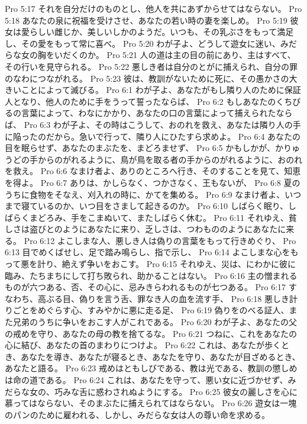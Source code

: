 Pro 5:17  それを自分だけのものとし、他人を共にあずからせてはならない。
Pro 5:18  あなたの泉に祝福を受けさせ、あなたの若い時の妻を楽しめ。
Pro 5:19  彼女は愛らしい雌じか、美しいしかのようだ。いつも、その乳ぶさをもって満足し、その愛をもって常に喜べ。
Pro 5:20  わが子よ、どうして遊女に迷い、みだらな女の胸をいだくのか。
Pro 5:21  人の道は主の目の前にあり、主はすべて、その行いを見守られる。
Pro 5:22  悪しき者は自分のとがに捕えられ、自分の罪のなわにつながれる。
Pro 5:23  彼は、教訓がないために死に、その愚かさの大きいことによって滅びる。
Pro 6:1  わが子よ、あなたがもし隣り人のために保証人となり、他人のために手をうって誓ったならば、
Pro 6:2  もしあなたのくちびるの言葉によって、わなにかかり、あなたの口の言葉によって捕えられたならば、
Pro 6:3  わが子よ、その時はこうして、おのれを救え、あなたは隣り人の手に陥ったのだから。急いで行って、隣り人にひたすら求めよ。
Pro 6:4  あなたの目を眠らせず、あなたのまぶたを、まどろませず、
Pro 6:5  かもしかが、かりゅうどの手からのがれるように、鳥が鳥を取る者の手からのがれるように、おのれを救え。
Pro 6:6  なまけ者よ、ありのところへ行き、そのすることを見て、知恵を得よ。
Pro 6:7  ありは、かしらなく、つかさなく、王もないが、
Pro 6:8  夏のうちに食物をそなえ、刈入れの時に、かてを集める。
Pro 6:9  なまけ者よ、いつまで寝ているのか、いつ目をさまして起きるのか。
Pro 6:10  しばらく眠り、しばらくまどろみ、手をこまぬいて、またしばらく休む。
Pro 6:11  それゆえ、貧しさは盗びとのようにあなたに来り、乏しさは、つわもののようにあなたに来る。
Pro 6:12  よこしまな人、悪しき人は偽りの言葉をもって行きめぐり、
Pro 6:13  目でめくばせし、足で踏み鳴らし、指で示し、
Pro 6:14  よこしまな心をもって悪を計り、絶えず争いをおこす。
Pro 6:15  それゆえ、災は、にわかに彼に臨み、たちまちにして打ち敗られ、助かることはない。
Pro 6:16  主の憎まれるものが六つある、否、その心に、忌みきらわれるものが七つある。
Pro 6:17  すなわち、高ぶる目、偽りを言う舌、罪なき人の血を流す手、
Pro 6:18  悪しき計りごとをめぐらす心、すみやかに悪に走る足、
Pro 6:19  偽りをのべる証人、また兄弟のうちに争いをおこす人がこれである。
Pro 6:20  わが子よ、あなたの父の戒めを守り、あなたの母の教を捨てるな。
Pro 6:21  つねに、これをあなたの心に結び、あなたの首のまわりにつけよ。
Pro 6:22  これは、あなたが歩くとき、あなたを導き、あなたが寝るとき、あなたを守り、あなたが目ざめるとき、あなたと語る。
Pro 6:23  戒めはともしびである、教は光である、教訓の懲しめは命の道である。
Pro 6:24  これは、あなたを守って、悪い女に近づかせず、みだらな女の、巧みな舌に惑わされぬようにする。
Pro 6:25  彼女の麗しさを心に慕ってはならない、そのまぶたに捕えられてはならない。
Pro 6:26  遊女は一塊のパンのために雇われる、しかし、みだらな女は人の尊い命を求める。
